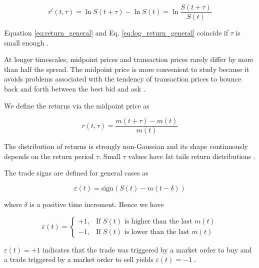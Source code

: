 \begin{equation}\label{eq:log_return_general}
    r^{l}\left(t,\tau\right) = \ln S\left(t + \tau\right)
    - \ln S\left(t\right) = \ln \frac{S\left(t + \tau\right)}{S\left(t\right)}
\end{equation}

Equation \ref{eq:return_general} and Eq. \ref{eq:log_return_general} coincide
if $\tau$ is small enough \cite{subtle_nature,empirical_facts}.

At longer timescales, midpoint prices and transaction prices rarely differ by
more than half the spread. The midpoint price is more convenient to study
because it avoids problems associated with the tendency of transaction prices
to bounce back and forth between the best bid and ask
\cite{large_prices_changes}.

We define the returns via the midpoint price as

\begin{equation}\label{eq:midpoint_price_return}
    r\left(t,\tau\right) = \frac{m\left(t+\tau\right)-m\left(t\right)}
    {m\left(t\right)}
\end{equation}

The distribution of returns is strongly non-Gaussian and its shape continuously
depends on the return period $\tau$. Small $\tau$ values have fat tails return
distributions \cite{subtle_nature}.

The trade signs are defined for general cases as

\begin{equation}\label{eq:trade_sign_general}
    \varepsilon\left(t\right)=\text{sign}\left(S\left(t\right)
    -m\left(t-\delta\right)\right)
\end{equation}

where $\delta$ is a positive time increment. Hence we have

\begin{equation}\label{eq:trade_sign_results}
    \varepsilon\left(t\right)=\left\{
    \begin{array}{cc}
    +1, & \text{If } S\left(t\right)
    \text{ is higher than the last } m\left( t \right)\\
    -1, & \text{If } S\left(t\right)
    \text{ is lower than the last } m\left( t \right)
    \end{array}\right.
\end{equation}

$\varepsilon(t) = +1$ indicates that the trade was triggered by a market order
to buy and a trade triggered by a market order to sell yields
$\varepsilon(t) = -1$
\cite{subtle_nature,Bouchaud_2004,spread_changes_affect,quant_stock_price_response,order_flow_persistent}.

